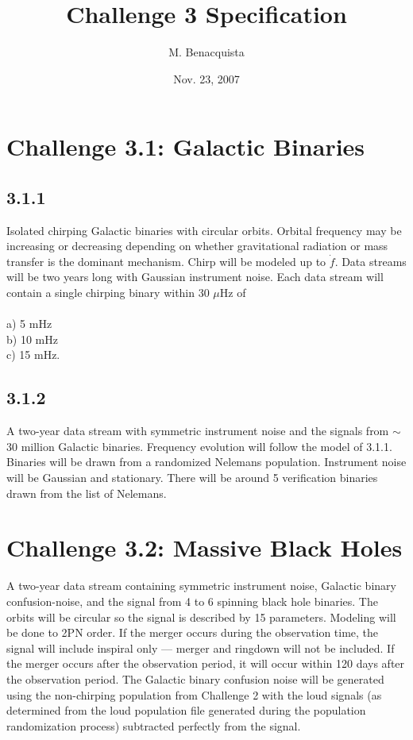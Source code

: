 \documentclass[11pt]{article}
\title{Challenge 3 Specification}
\author{M. Benacquista}
\date{Nov. 23, 2007}                                          %
\begin{document}
\maketitle
\section*{Challenge 3.1: Galactic Binaries}
\subsection*{3.1.1}

Isolated chirping Galactic binaries with circular orbits. Orbital frequency may be increasing or decreasing depending on whether gravitational radiation or mass transfer is the dominant mechanism. Chirp will be modeled up to $\dot{f}$. Data streams will be two years long with Gaussian instrument noise. Each data stream will contain a single chirping binary within 30 $\mu$Hz of \\
\\
a) 5 mHz \\
b) 10 mHz \\
c) 15 mHz.

\subsection*{3.1.2}

A two-year data stream with symmetric instrument noise and the signals from $\sim$ 30 million Galactic binaries. Frequency evolution will follow the model of 3.1.1. Binaries will be drawn from a randomized Nelemans population. Instrument noise will be Gaussian and stationary. There will be around 5 verification binaries drawn from the list of Nelemans.

\section*{Challenge 3.2: Massive Black Holes}

A two-year data stream containing symmetric instrument noise, Galactic binary confusion-noise, and the signal from 4 to 6 spinning black hole binaries. The orbits will be circular so the signal is described by 15 parameters. Modeling will be done to 2PN order. If the merger occurs during the observation time, the signal will include inspiral only --- merger and ringdown will not be included. If the merger occurs after the observation period, it will occur within 120 days after the observation period. The Galactic binary confusion noise will be generated using the non-chirping population from Challenge 2 with the loud signals (as determined from the loud population file generated during the population randomization process) subtracted perfectly from the signal.
\end{document}
